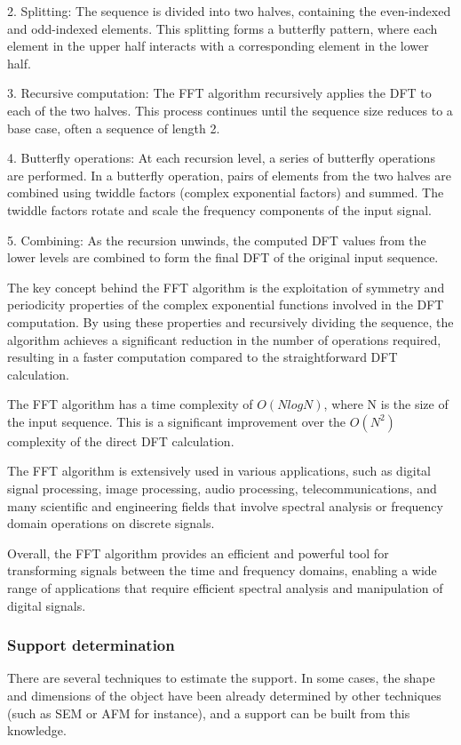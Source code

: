2. Splitting: The sequence is divided into two halves, containing the even-indexed and odd-indexed elements. This splitting forms a butterfly pattern, where each element in the upper half interacts with a corresponding element in the lower half.

3. Recursive computation: The FFT algorithm recursively applies the DFT to each of the two halves. This process continues until the sequence size reduces to a base case, often a sequence of length 2.

4. Butterfly operations: At each recursion level, a series of butterfly operations are performed. In a butterfly operation, pairs of elements from the two halves are combined using twiddle factors (complex exponential factors) and summed. The twiddle factors rotate and scale the frequency components of the input signal.

5. Combining: As the recursion unwinds, the computed DFT values from the lower levels are combined to form the final DFT of the original input sequence.

The key concept behind the FFT algorithm is the exploitation of symmetry and periodicity properties of the complex exponential functions involved in the DFT computation. By using these properties and recursively dividing the sequence, the algorithm achieves a significant reduction in the number of operations required, resulting in a faster computation compared to the straightforward DFT calculation.

The FFT algorithm has a time complexity of $O(N log N)$, where N is the size of the input sequence. This is a significant improvement over the $O(N^2)$ complexity of the direct DFT calculation.

The FFT algorithm is extensively used in various applications, such as digital signal processing, image processing, audio processing, telecommunications, and many scientific and engineering fields that involve spectral analysis or frequency domain operations on discrete signals.

Overall, the FFT algorithm provides an efficient and powerful tool for transforming signals between the time and frequency domains, enabling a wide range of applications that require efficient spectral analysis and manipulation of digital signals.

\subsubsection{Support determination}
There are several techniques to estimate the support. In some cases, the shape and dimensions of the object have been already determined by other techniques (such as SEM or AFM for instance), and a support can be built from this knowledge.

